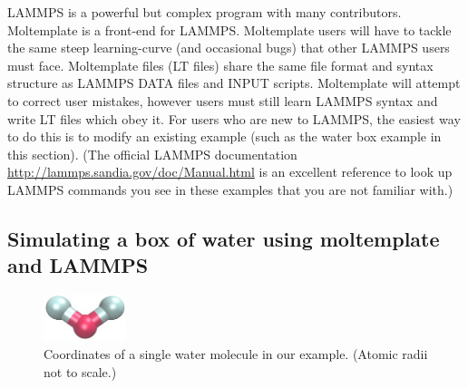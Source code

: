 \documentclass[11pt]{article}
\begin{document}
LAMMPS is a powerful but complex program with many contributors. 
Moltemplate is a front-end for LAMMPS.
Moltemplate users will have to tackle the same steep learning-curve
(and occasional bugs) that other LAMMPS users must face.
Moltemplate files (LT files) share the same file format and 
syntax structure as LAMMPS DATA files and INPUT scripts.
Moltemplate will attempt to correct user mistakes,
however users must still learn 
LAMMPS syntax and write LT files which obey it.
For users who are new to LAMMPS, the easiest way 
to do this is to modify an existing example 
(such as the water box example in this section).
(The official LAMMPS documentation 
\url{http://lammps.sandia.gov/doc/Manual.html}
is an excellent reference to look up LAMMPS commands
you see in these examples that you are not familiar with.)



\subsection{Simulating a box of water using moltemplate and LAMMPS}
\label{sec:spce_example}

\begin{figure}[htbp]
\centering
\includegraphics[width=2.4cm]{single_water_LR.jpg}
\caption{
\label{fig:single_water}
Coordinates of a single water molecule in our example.
(Atomic radii not to scale.)
}
\end{figure}
\end{document}
